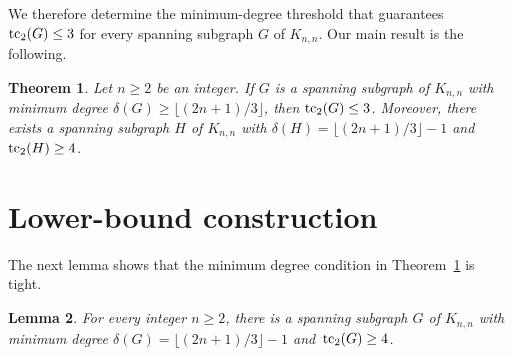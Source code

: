 \documentclass[12pt,reqno,a4paper]{amsart}
\newtheorem{theorem}             {Theorem}[section]
\newtheorem{lemma}     [theorem] {Lemma}
\def\tc{\mathop{\text{\rm tc}}\nolimits}
\begin{document}
We therefore determine the minimum-degree threshold that guarantees $\tc_2(G)\le3$ for
every spanning subgraph $G$ of $K_{n,n}$. Our main result is the following.

\begin{theorem}\label{thm:main}   
Let $n \geq 2$ be an integer. If $G$ is a spanning subgraph of $K_{n,n}$ with
minimum degree $\delta(G)\ge \lfloor (2n+1)/3 \rfloor$, then $\tc_2(G)\le 3$.
Moreover, there exists a spanning subgraph $H$ of $K_{n,n}$ with $\delta(H) =
\lfloor (2n+1)/3 \rfloor-1$ and~$\tc_2(H) \geq 4$.
\end{theorem}


\section{Lower-bound construction}\label{sec:lower}
%
The next lemma shows that the minimum degree condition in Theorem~\ref{thm:main} is tight.

\begin{lemma}\label{lem:lower} 
%    
For every integer $n \geq 2$, there is a spanning subgraph $G$ of $K_{n,n}$ with
minimum degree $\delta(G) = \lfloor (2n+1)/3 \rfloor-1$ and~$\tc_2(G)\geq 4$.
\end{lemma}
\end{document}
